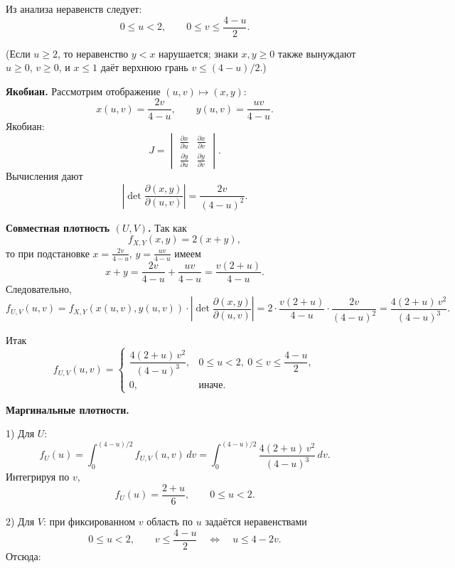 \documentclass[12pt]{article}
\begin{document}
    Из анализа неравенств следует:
    \[
        0 \le u < 2,\qquad
        0 \le v \le \frac{4-u}{2}.
    \]

    (Если $u \ge 2$, то неравенство $y<x$ нарушается; знаки $x,y \ge 0$ также вынуждают $u\ge0$, $v\ge0$, и $x\le1$ даёт верхнюю грань $v\le(4-u)/2$.)

    \textbf{Якобиан.}
    Рассмотрим отображение $(u,v)\mapsto (x,y)$:
    \[
        x(u,v)=\frac{2v}{4-u},\qquad
        y(u,v)=\frac{uv}{4-u}.
    \]
    Якобиан:
    \[
        J =
        \begin{vmatrix}
            \frac{\partial x}{\partial u} & \frac{\partial x}{\partial v}\\[6pt]
            \frac{\partial y}{\partial u} & \frac{\partial y}{\partial v}
        \end{vmatrix}.
    \]
    Вычисления дают
    \[
        \left|\det \frac{\partial(x,y)}{\partial(u,v)}\right|
        = \frac{2v}{(4-u)^2}.
    \]

    \textbf{Совместная плотность $(U,V)$.}
    Так как
    \[
        f_{X,Y}(x,y) = 2(x+y),
    \]
    то при подстановке $x=\frac{2v}{4-u}$, $y=\frac{uv}{4-u}$ имеем
    \[
        x+y = \frac{2v}{4-u} + \frac{uv}{4-u}
        = \frac{v(2+u)}{4-u}.
    \]
    Следовательно,
    \[
        f_{U,V}(u,v)
        = f_{X,Y}(x(u,v),y(u,v))
        \cdot
        \left|\det \frac{\partial(x,y)}{\partial(u,v)}\right|
        = 2 \cdot \frac{v(2+u)}{4-u}
        \cdot
        \frac{2v}{(4-u)^2}
        = \frac{4(2+u)\,v^2}{(4-u)^3}.
    \]

    Итак
    \[
        f_{U,V}(u,v)
        =
        \begin{cases}
            \dfrac{4(2+u)\,v^2}{(4-u)^3}, & 0 \le u < 2,\ 0 \le v \le \dfrac{4-u}{2},\\[10pt]
            0, & \text{иначе.}
        \end{cases}
    \]

    \textbf{Маргинальные плотности.}

    1) Для $U$:
    \[
        f_U(u)
        = \int_0^{(4-u)/2} f_{U,V}(u,v)\,dv
        = \int_0^{(4-u)/2} \frac{4(2+u)\,v^2}{(4-u)^3}\,dv.
    \]
    Интегрируя по $v$,
    \[
        f_U(u)
        = \frac{2+u}{6}, \qquad 0 \le u < 2.
    \]

    2) Для $V$:
    при фиксированном $v$ область по $u$ задаётся неравенствами
    \[
        0 \le u < 2,\qquad
        v \le \frac{4-u}{2}
        \quad\Longleftrightarrow\quad
        u \le 4-2v.
    \]
    Отсюда:
\end{document}
